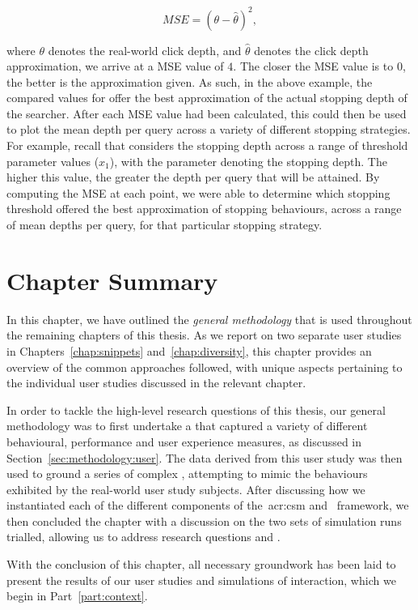 \vspace*{-4mm}
\begin{equation}
MSE = (\theta - \hat{\theta})^{2},
\end{equation}

where $\theta$ denotes the real-world click depth, and $\hat{\theta}$ denotes the click depth approximation, we arrive at a MSE value of $4$. The closer the MSE value is to $0$, the better is the approximation given. As such, in the above example, the compared values for  offer the best approximation of the actual stopping depth of the searcher. After each MSE value had been calculated, this could then be used to plot the mean depth per query across a variety of different stopping strategies. For example, recall that  considers the stopping depth across a range of threshold parameter values ($x_1$), with the parameter denoting the stopping depth. The higher this value, the greater the depth per query that will be attained. By computing the MSE at each point, we were able to determine which stopping threshold offered the best approximation of stopping behaviours, across a range of mean depths per query, for that particular stopping strategy.

\section{Chapter Summary}
In this chapter, we have outlined the \emph{general methodology} that is used throughout the remaining chapters of this thesis. As we report on two separate user studies in Chapters~\ref{chap:snippets} and~\ref{chap:diversity}, this chapter provides an overview of the common approaches followed, with unique aspects pertaining to the individual user studies discussed in the relevant chapter.

In order to tackle the high-level research questions of this thesis, our general methodology was to first undertake a  that captured a variety of different behavioural, performance and user experience measures, as discussed in Section~\ref{sec:methodology:user}. The data derived from this user study was then used to ground a series of complex , attempting to mimic the behaviours exhibited by the real-world user study subjects. After discussing how we instantiated each of the different components of the~\gls{acr:csm} and \simiir~framework, we then concluded the chapter with a discussion on the two sets of simulation runs trialled, allowing us to address research questions  and .

With the conclusion of this chapter, all necessary groundwork has been laid to present the results of our user studies and simulations of interaction, which we begin in Part~\ref{part:context}.